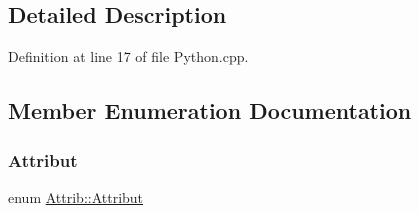 \subsection{Detailed Description}


Definition at line 17 of file Python.\+cpp.



\subsection{Member Enumeration Documentation}
\mbox{\label{classAttrib_a69e171d7cc6417835a5a306d3c764235}} 
\subsubsection{\texorpdfstring{Attribut}{Attribut}}
{\footnotesize\ttfamily enum \hyperlink{classAttrib_a69e171d7cc6417835a5a306d3c764235}{Attrib\+::\+Attribut}\hspace{0.3cm}{\ttfamily [inherited]}}


